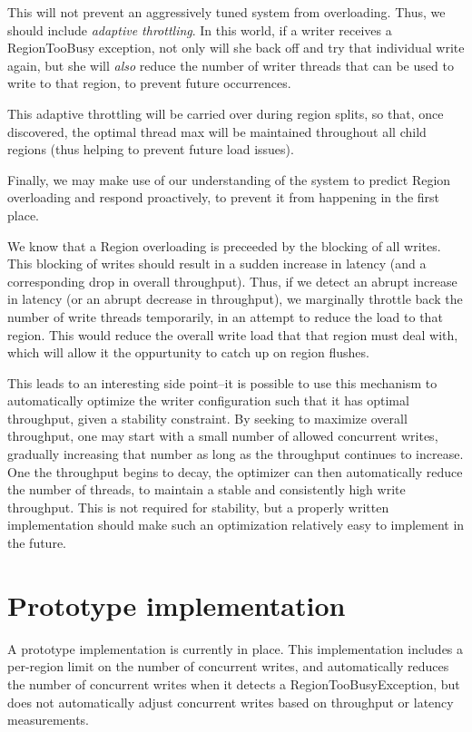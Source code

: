 \documentclass[11pt]{article}
\begin{document}
This will not prevent an aggressively tuned system from overloading. Thus, we should include \emph{adaptive throttling}. In this world, if a writer receives
a RegionTooBusy exception, not only will she back off and try that individual write again, but she will \emph{also} reduce the number of 
writer threads that can be used to write to that region, to prevent future occurrences. 

This adaptive throttling will be carried over during region splits, so that, once discovered, the optimal thread max will be maintained throughout all child
regions (thus helping to prevent future load issues).

Finally, we may make use of our understanding of the system to predict Region overloading and respond proactively, to prevent it from happening in the first place. 

We know that a Region overloading is preceeded by the blocking of all writes. This blocking of writes should result in a sudden increase in latency (and a 
corresponding drop in overall throughput). Thus, if we detect an abrupt increase in latency (or an abrupt decrease in throughput), 
we marginally throttle back the number of write threads temporarily, in an attempt to reduce the load to that region. This would reduce the overall write
load that that region must deal with, which will allow it the oppurtunity to catch up on region flushes.

This leads to an interesting side point--it is possible to use this mechanism to automatically optimize the writer configuration such that it has optimal throughput,
given a stability constraint. By seeking to maximize overall throughput, one may start with a small number of allowed concurrent writes, gradually increasing that
number as long as the throughput continues to increase. One the throughput begins to decay, the optimizer can then automatically reduce the number of threads, to 
maintain a stable and consistently high write throughput. This is not required for stability, but a properly written implementation should make such an optimization
relatively easy to implement in the future.

\section{Prototype implementation}
A prototype implementation is currently in place. This implementation includes a per-region limit on the number of concurrent writes, and automatically reduces
the number of concurrent writes when it detects a RegionTooBusyException, but does not automatically adjust concurrent writes based on throughput or latency 
measurements.
\end{document}
